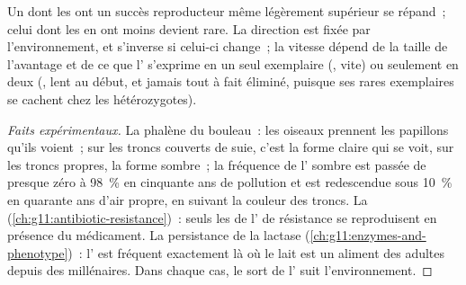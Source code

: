 \begin{proposition}\label{prop:g12:selection-drift-speciation:direction}
Un  dont les  ont un succès reproducteur même légèrement
supérieur se répand~; celui dont les  en ont moins devient
rare. La direction est fixée par l'environnement, et s'inverse si
celui-ci change~; la vitesse dépend de la taille de l'avantage et de ce
que l' s'exprime en un seul exemplaire (, vite) ou
seulement en deux (, lent au début, et jamais tout à fait
éliminé, puisque ses rares exemplaires se cachent chez les
hétérozygotes).
\end{proposition}
\begin{proof}[Faits expérimentaux]
La phalène du bouleau~: les oiseaux prennent les papillons qu'ils
voient~; sur les troncs couverts de suie, c'est la forme claire qui se
voit, sur les troncs propres, la forme sombre~; la fréquence de
l' sombre est passée de presque zéro à 98~\% en cinquante ans de
pollution et est redescendue sous 10~\% en quarante ans d'air propre,
en suivant la couleur des troncs. La 
(\cref{ch:g11:antibiotic-resistance})~: seuls les  de l'
de résistance se reproduisent en présence du médicament. La persistance
de la lactase (\cref{ch:g11:enzymes-and-phenotype})~: l' est
fréquent exactement là où le lait est un aliment des adultes depuis des
millénaires. Dans chaque cas, le sort de l' suit
l'environnement.
\end{proof}

